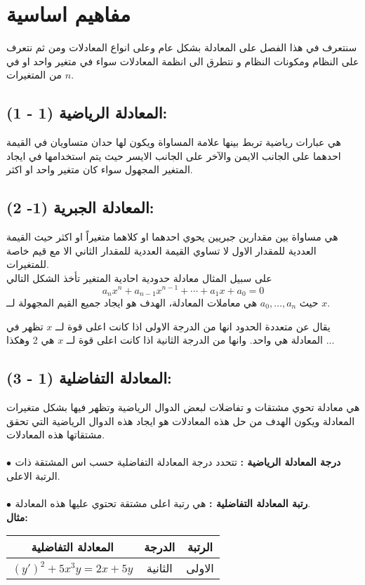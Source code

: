 \chapter{مفاهيم اساسية}

سنتعرف في هذا الفصل على المعادلة بشكل عام وعلى انواع المعادلات ومن ثم نتعرف على النظام ومكونات النظام و نتطرق الى انظمة المعادلات سواء في متغير واحد او في $n$ من المتغيرات.

\section*{المعادلة الرياضية (1 - 1):}
هي عبارات رياضية تربط بينها علامة المساواة ويكون لها حدان متساويان في القيمة احدهما على الجانب الايمن والآخر على الجانب الايسر حيث يتم استخدامها في ايجاد المتغير المجهول سواء كان متغير واحد او اكثر.

\section*{المعادلة الجبرية (1- 2):}
هي مساواة بين مقدارين جبريين يحوي احدهما او كلاهما متغيراً او اكثر حيث القيمة العددية للمقدار الاول لا تساوي القيمة العددية للمقدار الثاني الا مع قيم خاصة للمتغيرات.\\
على سبيل المثال معادلة حدودية احادية المتغير تأخذ الشكل التالي
\[
a_n x^n + a_{n-1}x^{n-1} + \cdots + a_1 x + a_0 = 0
\]
حيث $a_0, \dots, a_n$ هي معاملات المعادلة، الهدف هو ايجاد جميع القيم المجهولة لــ $x$.

\begin{note}
	يقال عن متعددة الحدود انها من الدرجة الاولى اذا كانت اعلى قوة لــ $x$ تظهر في المعادلة هي واحد. وانها من الدرجة الثانية اذا كانت اعلى قوة لــ $x$ هي 2 وهكذا ...
\end{note}

\section*{المعادلة التفاضلية (1 - 3):}
هي معادلة تحوي مشتقات و تفاضلات لبعض الدوال الرياضية وتظهر فيها بشكل متغيرات المعادلة ويكون الهدف من حل هذه المعادلات هو ايجاد هذه الدوال الرياضية التي تحقق مشتقاتها هذه المعادلات.\\
\\
\textbf{$\bullet$ درجة المعادلة الرياضية :}
تتحدد درجة المعادلة التفاضلية حسب اس المشتقة ذات الرتبة الاعلى.\\ \\
\textbf{$\bullet$ رتبة المعادلة التفاضلية :}
هي رتبة اعلى مشتقة تحتوي عليها هذه المعادلة.\\
\noindent
\textbf{مثال:}
	\begin{table}[H]
		\renewcommand{\arraystretch}{1.4}
		\centering
		\begin{tabular}{|c|c|c|}
			\hline
			\textbf{المعادلة التفاضلية} & \textbf{الدرجة} & \textbf{الرتبة}\\
			\hline
			$(y')^2 + 5x^3 y = 2x + 5y$ & الثانية & الاولى\\
			\hline
		\end{tabular}
	\end{table}

